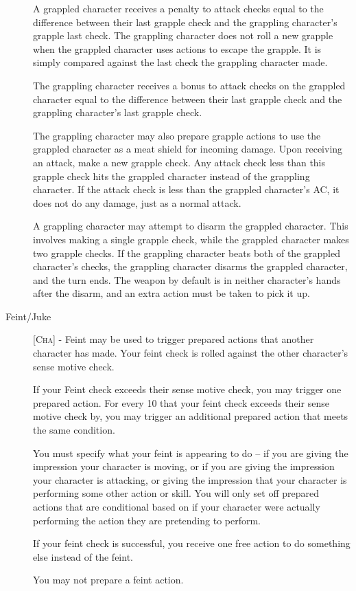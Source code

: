 \begin{description}
A grappled character receives a penalty to attack checks equal to the difference between their last grapple check and the grappling character’s grapple last check. The grappling character does not roll a new grapple when the grappled character uses actions to escape the grapple. It is simply compared against the last check the grappling character made.

The grappling character receives a bonus to attack checks on the grappled character equal to the difference between their last grapple check and the grappling character’s last grapple check.

The grappling character may also prepare grapple actions to use the grappled character as a meat shield for incoming damage. Upon receiving an attack, make a new grapple check. Any attack check less than this grapple check hits the grappled character instead of the grappling character. If the attack check is less than the grappled character's AC, it does not do any damage, just as a normal attack.

A grappling character may attempt to disarm the grappled character. This involves making a single grapple check, while the grappled character makes two grapple checks. If the grappling character beats both of the grappled character's checks, the grappling character disarms the grappled character, and the turn ends. The weapon by default is in neither character's hands after the disarm, and an extra action must be taken to pick it up.

\item[Feint/Juke] [\textsc{Cha}] - Feint may be used to trigger prepared actions that another character has made. Your feint check is rolled against the other character’s sense motive check.

If your Feint check exceeds their sense motive check, you may trigger one prepared action. For every 10 that your feint check exceeds their sense motive check by, you may trigger an additional prepared action that meets the same condition.

You must specify what your feint is appearing to do -- if you are giving the impression your character is moving, or if you are giving the impression your character is attacking, or giving the impression that your character is performing some other action or skill. You will only set off prepared actions that are conditional based on if your character were actually performing the action they are pretending to perform.

If your feint check is successful, you receive one free action to do something else instead of the feint.

You may not prepare a feint action.
\end{description}